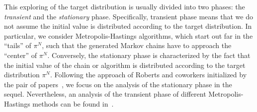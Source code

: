 This exploring of the target distribution is usually divided into two phases: the \textit{transient} and the \textit{stationary} phase. Specifically, transient phase means that we do not assume the initial value is distributed according to the target distribution. In particular, we consider Metropolis-Hastings algorithms, which start out far in the ``tails'' of $ \pi^{N} $, such that the generated Markov chains have to approach the ``center'' of $ \pi^{N} $. Conversely, the stationary phase is characterized by the fact that the initial value of the chain or algorithm is distributed according to the target distribution $ \pi^{N} $. Following the approach of Roberts and coworkers initialized by the pair of papers~\autocite{Roberts1997, Roberts2001}, we focus on the analysis of the stationary phase in the sequel. Nevertheless, an analysis of the transient phase of different Metropolis-Hastings methods can be found in~\autocite{Christensen2003, Jourdain2013}.




